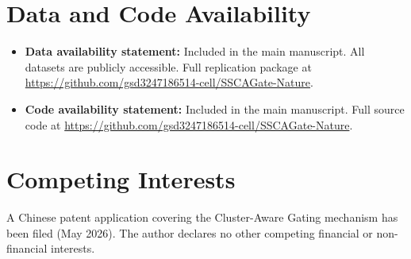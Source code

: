 \documentclass[12pt]{article}
\begin{document}
\section*{Data and Code Availability}

\begin{itemize}
\item \textbf{Data availability statement:} Included in the main manuscript. All datasets are publicly accessible. Full replication package at \url{https://github.com/gsd3247186514-cell/SSCAGate-Nature}.
\item \textbf{Code availability statement:} Included in the main manuscript. Full source code at \url{https://github.com/gsd3247186514-cell/SSCAGate-Nature}.
\end{itemize}

\section*{Competing Interests}

A Chinese patent application covering the Cluster-Aware Gating mechanism has been filed (May 2026). The author declares no other competing financial or non-financial interests.
\end{document}
